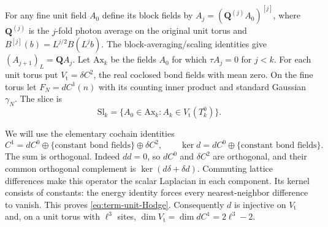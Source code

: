 \documentclass[11pt,letterpaper,reqno]{amsart}
\begin{document}
For any fine unit field $A_0$ define its block fields by
$A_j=(\mathbf Q^{(j)}A_0)^{[j]}$, where $\mathbf Q^{(j)}$
is the $j$-fold photon average on the original unit torus and
$B^{[j]}(b)=L^{j/2}B(L^jb)$.
The block-averaging/scaling identities give
$(A_{j+1})_L=\mathbf QA_j$.
Let $\mathrm{Ax}_k$ be the fields $A_0$ for which
$\tau A_j=0$ for $j<k$.
For each unit torus put
$V_{\mathrm t}=\delta C^2$, the real coclosed bond
fields with mean zero.
On the fine torus let $F_N=dC^1(n)$ with its
counting inner product and standard Gaussian
$\gamma_N$. The slice is
\[
 \mathrm{Sl}_k=\{A_0\in\mathrm{Ax}_k:A_k\in V_{\mathrm t}(T_k^0)\}.
\]

We will use the elementary cochain identities
\begin{equation}\label{eq:term-unit-Hodge}
 C^1=dC^0\oplus\{\text{constant bond fields}\}\oplus\delta C^2,
       \qquad \ker d=dC^0\oplus\{\text{constant bond fields}\}.
\end{equation}
The sum is orthogonal. Indeed $dd=0$, so $dC^0$
and $\delta C^2$ are orthogonal, and their common
orthogonal complement is $\ker(d\delta+\delta d)$.
Commuting lattice differences make this operator
the scalar Laplacian in each component.
Its kernel consists of constants: the energy identity
forces every nearest-neighbor difference to vanish.
This proves \eqref{eq:term-unit-Hodge}.
Consequently $d$ is injective on $V_{\mathrm t}$ and,
on a unit torus with $\ell^3$ sites,
$\dim V_{\mathrm t}=\dim dC^1=2\ell^3-2$.
\end{document}
